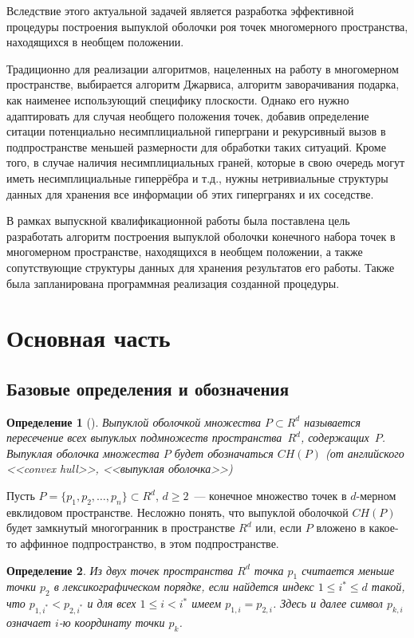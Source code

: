 \documentclass[14pt]{extarticle}
\newtheorem{definition}{Определение}
\begin{document}
Вследствие этого актуальной задачей является разработка эффективной процедуры построения выпуклой оболочки роя точек многомерного пространства, находящихся в необщем положении.

Традиционно для реализации алгоритмов, нацеленных на работу в многомерном пространстве, выбирается алгоритм Джарвиса, алгоритм заворачивания подарка, как наименее использующий специфику плоскости. Однако его нужно адаптировать для случая необщего положения точек, добавив определение ситации потенциально несимплициальной гиперграни и рекурсивный вызов в подпространстве меньшей размерности для обработки таких ситуаций. Кроме того, в случае наличия несимплициальных граней, которые в свою очередь могут иметь несимплициальные гиперрёбра и т.д., нужны нетривиальные структуры данных для хранения все информации об этих гипергранях и их соседстве.

В рамках выпускной квалификационной работы была поставлена цель разработать алгоритм построения выпуклой оболочки конечного набора точек в многомерном пространстве, находящихся в необщем положении, а также сопутствующие структуры данных для хранения результатов его работы. Также была запланирована программная реализация созданной процедуры.

\newpage
\section{Основная часть}

\subsection{Базовые определения и обозначения}

\begin{definition}[\cite{bib:kokichi}]
\emph{Выпуклой оболочкой} множества $P \subset R^d$ называется пересечение всех выпуклых подмножеств пространства~$R^d$, содержащих~$P$. Выпуклая оболочка множества $P$ будет обозначаться $CH(P)$ (от английского <<convex hull>>, <<выпуклая оболочка>>)
\end{definition}

Пусть $P = \{p_1, p_2, \ldots, p_n\} \subset R^d$, $d \geqslant 2$~--- конечное множество точек в $d$-мерном евклидовом пространстве. Несложно понять, что выпуклой оболочкой $CH(P)$ будет замкнутый многогранник в пространстве $R^d$ или, если $P$ вложено в какое-то аффинное подпространство, в этом подпространстве.

\begin{definition}
Из двух точек пространства $R^d$ точка $p_1$ считается меньше точки $p_2$ \emph{в лексикографическом порядке}, если найдется индекс $1 \leqslant i^* \leqslant d$ такой, что $p_{1,i^*} < p_{2,i^*}$ и для всех $1 \leqslant i < i^*$ имеем $p_{1,i} = p_{2,i}$. Здесь и далее символ $p_{k,i}$ означает $i$-ю координату точки $p_k$.
\end{definition}
\end{document}

